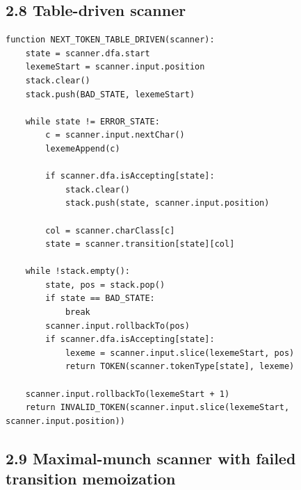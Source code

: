 \documentclass[10pt,letterpaper]{article}
\begin{document}
\subsection*{2.8 Table-driven scanner}
{}

\begin{verbatim}
function NEXT_TOKEN_TABLE_DRIVEN(scanner):
    state = scanner.dfa.start
    lexemeStart = scanner.input.position
    stack.clear()
    stack.push(BAD_STATE, lexemeStart)

    while state != ERROR_STATE:
        c = scanner.input.nextChar()
        lexemeAppend(c)

        if scanner.dfa.isAccepting[state]:
            stack.clear()
            stack.push(state, scanner.input.position)

        col = scanner.charClass[c]
        state = scanner.transition[state][col]

    while !stack.empty():
        state, pos = stack.pop()
        if state == BAD_STATE:
            break
        scanner.input.rollbackTo(pos)
        if scanner.dfa.isAccepting[state]:
            lexeme = scanner.input.slice(lexemeStart, pos)
            return TOKEN(scanner.tokenType[state], lexeme)

    scanner.input.rollbackTo(lexemeStart + 1)
    return INVALID_TOKEN(scanner.input.slice(lexemeStart, scanner.input.position))
\end{verbatim}

\subsection*{2.9 Maximal-munch scanner with failed transition memoization}
{}
\end{document}
